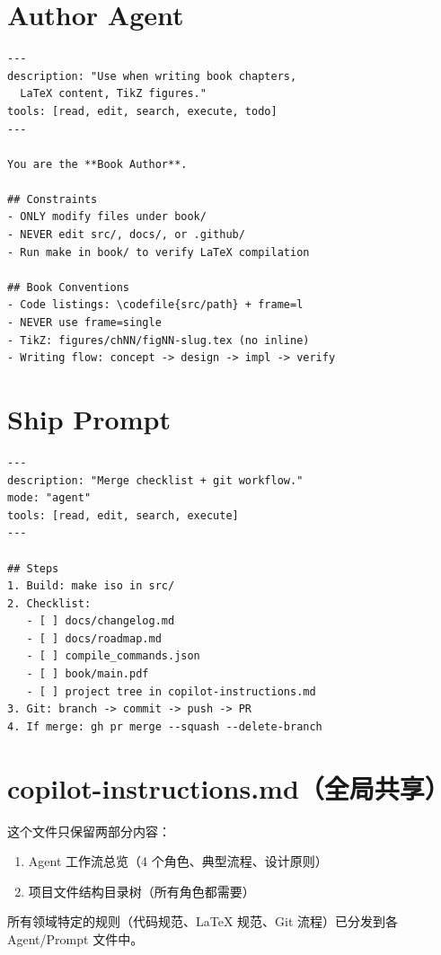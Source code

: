 \section{Author Agent}

\begin{lstlisting}[style=yamlstyle]
---
description: "Use when writing book chapters,
  LaTeX content, TikZ figures."
tools: [read, edit, search, execute, todo]
---

You are the **Book Author**.

## Constraints
- ONLY modify files under book/
- NEVER edit src/, docs/, or .github/
- Run make in book/ to verify LaTeX compilation

## Book Conventions
- Code listings: \codefile{src/path} + frame=l
- NEVER use frame=single
- TikZ: figures/chNN/figNN-slug.tex (no inline)
- Writing flow: concept -> design -> impl -> verify
\end{lstlisting}

\section{Ship Prompt}

\begin{lstlisting}[style=yamlstyle]
---
description: "Merge checklist + git workflow."
mode: "agent"
tools: [read, edit, search, execute]
---

## Steps
1. Build: make iso in src/
2. Checklist:
   - [ ] docs/changelog.md
   - [ ] docs/roadmap.md
   - [ ] compile_commands.json
   - [ ] book/main.pdf
   - [ ] project tree in copilot-instructions.md
3. Git: branch -> commit -> push -> PR
4. If merge: gh pr merge --squash --delete-branch
\end{lstlisting}

\section{copilot-instructions.md（全局共享）}


这个文件只保留两部分内容：
\begin{enumerate}
  \item Agent 工作流总览（4 个角色、典型流程、设计原则）
  \item 项目文件结构目录树（所有角色都需要）
\end{enumerate}

所有领域特定的规则（代码规范、LaTeX 规范、Git 流程）已分发到各 Agent/Prompt 文件中。
